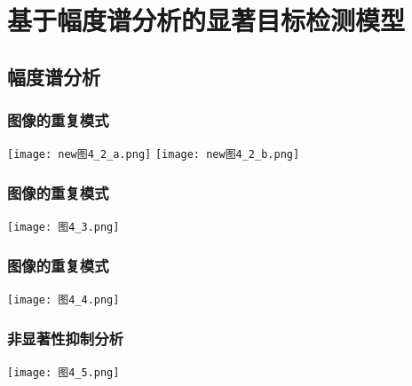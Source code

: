 \documentclass[notheorems,mathserif,table,compress]{beamer}  %
\begin{document}
\section{基于幅度谱分析的显著目标检测模型}
\subsection{幅度谱分析}

\begin{frame}
  \frametitle{图像的重复模式}

\begin{center}
\texttt{[image: new图4\_2\_a.png]}%
\hspace{2em}
\texttt{[image: new图4\_2\_b.png]}%
\end{center}
\end{frame}

\begin{frame}
  \frametitle{图像的重复模式}
\begin{center}
\texttt{[image: 图4\_3.png]}%
\end{center}
\end{frame}

\begin{frame}
  \frametitle{图像的重复模式}
\begin{center}
\texttt{[image: 图4\_4.png]}%
\end{center}
\end{frame}

\begin{frame}
  \frametitle{非显著性抑制分析}
\begin{center}
\texttt{[image: 图4\_5.png]}%
\end{center}
\end{frame}
\end{document}
